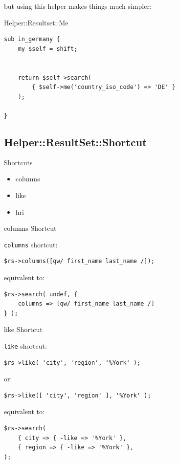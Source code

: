 but using this helper makes things much simpler:

\begin{frame}[fragile]{Helper::Resultset::Me}
\begin{lstlisting}
sub in_germany {
    my $self = shift;


    return $self->search(
        { $self->me('country_iso_code') => 'DE' }
    );

}
\end{lstlisting}
\end{frame}

\subsection{Helper::ResultSet::Shortcut}




\begin{frame}{Shortcuts}
\begin{itemize}
\item columns
\item like
\item hri
\end{itemize}
\end{frame}

\begin{frame}[fragile]{columns Shortcut}

\verb|columns| shortcut:

\begin{lstlisting}
$rs->columns([qw/ first_name last_name /]);
\end{lstlisting}

equivalent to:

\begin{lstlisting}
$rs->search( undef, { 
    columns => [qw/ first_name last_name /] 
} );
\end{lstlisting}
\end{frame}

\begin{frame}[fragile]{like Shortcut}

\verb|like| shortcut:

\begin{lstlisting}
$rs->like( 'city', 'region', '%York' );
\end{lstlisting}

or:

\begin{lstlisting}
$rs->like([ 'city', 'region' ], '%York' );
\end{lstlisting}

equivalent to:

\begin{lstlisting}
$rs->search(
    { city => { -like => '%York' },
    { region => { -like => '%York' },
);
\end{lstlisting}
\end{frame}

